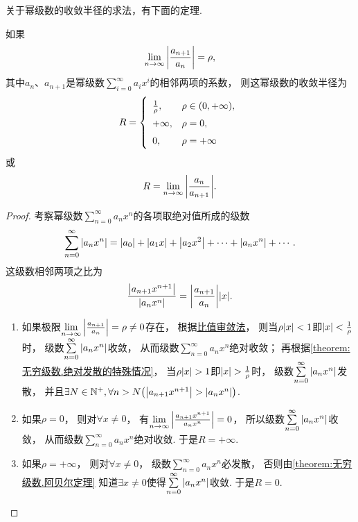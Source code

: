 关于幂级数的收敛半径的求法，有下面的定理.
\begin{theorem}\label{theorem:无穷级数.幂级数的收敛半径的求法}
如果\[
\lim\limits_{n\to\infty} \abs{\frac{a_{n+1}}{a_n}} = \rho,
\]其中\(a_n\)、\(a_{n+1}\)是幂级数\(\sum\limits_{i=0}^\infty {a_i x^i}\)的相邻两项的系数，
则这幂级数的收敛半径为\[
\def\arraystretch{1.5}
R = \left\{ \begin{array}{ll}
\frac{1}{\rho}, & \rho \in (0,+\infty), \\
+\infty, & \rho = 0, \\
0, & \rho = +\infty \\
\end{array} \right.
\]或\[
R = \lim\limits_{n\to\infty} {\abs{\frac{a_n}{a_{n+1}}}}.
\]
\begin{proof}
\def\s{\sum\limits_{n=0}^\infty }%
考察幂级数\(\s a_n x^n\)的各项取绝对值所成的级数\[
\s \abs{a_n x^n}
= \abs{a_0} + \abs{a_1 x} + \abs{a_2 x^2} + \dotsb + \abs{a_n x^n} + \dotsb.
\]
这级数相邻两项之比为\[
\frac{\abs{a_{n+1} x^{n+1}}}{\abs{a_n x^n}}
= \abs{\frac{a_{n+1}}{a_n}} \abs{x}.
\]

\begin{enumerate}
	\item 如果极限\(\lim\limits_{n\to\infty} \abs{\frac{a_{n+1}}{a_n}} = \rho\neq0\)存在，
根据\hyperref[theorem:无穷级数.正项级数的比值审敛法]{比值审敛法}，
则当\(\rho \abs{x} < 1\)即\(\abs{x} < \frac{1}{\rho}\)时，
级数\(\s \abs{a_n x^n}\)收敛，
从而级数\(\s a_n x^n\)绝对收敛；
再根据\cref{theorem:无穷级数.绝对发散的特殊情况}，
当\(\rho \abs{x} > 1\)即\(\abs{x} > \frac{1}{\rho}\)时，
级数\(\s \abs{a_n x^n}\)发散，
并且\(\exists N\in\mathbb{N}^+, \forall n > N \bigl(
	\abs{a_{n+1} x^{n+1}} > \abs{a_n x^n}
\bigr)\).
	\item 如果\(\rho=0\)，
则对\(\forall x\neq0\)，
有\(\lim\limits_{n\to\infty} \abs{\frac{a_{n+1} x^{n+1}}{a_n x^n}} = 0\)，
所以级数\(\s \abs{a_n x^n}\)收敛，
从而级数\(\s a_n x^n\)绝对收敛.%
于是\(R=+\infty\).
	\item 如果\(\rho=+\infty\)，
则对\(\forall x\neq0\)，
级数\(\s a_n x^n\)必发散，
否则由\cref{theorem:无穷级数.阿贝尔定理} 知道\(\exists x\neq0\)使得\(\s \abs{a_n x^n}\)收敛.
于是\(R=0\).
\qedhere
\end{enumerate}
\end{proof}
\end{theorem}

